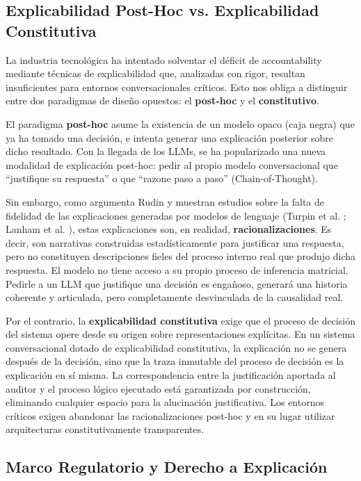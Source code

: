\documentclass[12pt,a4paper]{report}
\begin{document}
\subsection{Explicabilidad Post-Hoc vs. Explicabilidad Constitutiva}

La industria tecnológica ha intentado solventar el déficit de accountability mediante técnicas de explicabilidad que, analizadas con rigor, resultan insuficientes para entornos conversacionales críticos. Esto nos obliga a distinguir entre dos paradigmas de diseño opuestos: el \textbf{post-hoc} y el \textbf{constitutivo}.

El paradigma \textbf{post-hoc} asume la existencia de un modelo opaco (caja negra) que ya ha tomado una decisión, e intenta generar una explicación posterior sobre dicho resultado. Con la llegada de los LLMs, se ha popularizado una nueva modalidad de explicación post-hoc: pedir al propio modelo conversacional que ``justifique su respuesta'' o que ``razone paso a paso'' (Chain-of-Thought).

Sin embargo, como argumenta Rudin \cite{rudin2019stop} y muestran estudios sobre la falta de fidelidad de las explicaciones generadas por modelos de lenguaje (Turpin et al. \cite{turpin2023unfaithful}; Lanham et al. \cite{lanham2023faithfulness}), estas explicaciones son, en realidad, \textbf{racionalizaciones}. Es decir, son narrativas construidas estadísticamente para justificar una respuesta, pero no constituyen descripciones fieles del proceso interno real que produjo dicha respuesta. El modelo no tiene acceso a su propio proceso de inferencia matricial. Pedirle a un LLM que justifique una decisión es engañoso, generará una historia coherente y articulada, pero completamente desvinculada de la causalidad real.

Por el contrario, la \textbf{explicabilidad constitutiva} exige que el proceso de decisión del sistema opere desde su origen sobre representaciones explícitas. En un sistema conversacional dotado de explicabilidad constitutiva, la explicación no se genera después de la decisión, sino que la traza inmutable del proceso de decisión es la explicación en sí misma. La correspondencia entre la justificación aportada al auditor y el proceso lógico ejecutado está garantizada por construcción, eliminando cualquier espacio para la alucinación justificativa. Los entornos críticos exigen abandonar las racionalizaciones post-hoc y en su lugar utilizar arquitecturas constitutivamente transparentes.

\subsection{Marco Regulatorio y Derecho a Explicación}
\end{document}
